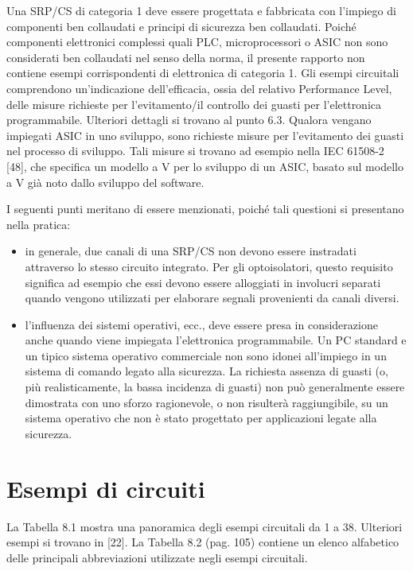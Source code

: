 Una SRP/CS di categoria 1 deve essere progettata e fabbricata con l'impiego di componenti ben collaudati e principi di sicurezza ben collaudati. Poiché componenti elettronici complessi quali PLC, microprocessori o ASIC non sono considerati ben collaudati nel senso della norma, il presente rapporto non contiene esempi corrispondenti di elettronica di categoria 1.
Gli esempi circuitali comprendono un'indicazione dell'efficacia, ossia del relativo Performance Level, delle misure richieste per l'evitamento/il controllo dei guasti per l'elettronica programmabile. Ulteriori dettagli si trovano al punto 6.3. Qualora vengano impiegati ASIC in uno sviluppo, sono richieste misure per l'evitamento dei guasti nel processo di sviluppo. Tali misure si trovano ad esempio nella IEC 61508-2 [48], che specifica un modello a V per lo sviluppo di un ASIC, basato sul modello a V già noto dallo sviluppo del software.

I seguenti punti meritano di essere menzionati, poiché tali questioni si presentano nella pratica:
\begin{itemize}
    \item in generale, due canali di una SRP/CS non devono essere instradati attraverso lo stesso circuito integrato. Per gli optoisolatori, questo requisito significa ad esempio che essi devono essere alloggiati in involucri separati quando vengono utilizzati per elaborare segnali provenienti da canali diversi.
    \item l'influenza dei sistemi operativi, ecc., deve essere presa in considerazione anche quando viene impiegata l'elettronica programmabile. Un PC standard e un tipico sistema operativo commerciale non sono idonei all'impiego in un sistema di comando legato alla sicurezza. La richiesta assenza di guasti (o, più realisticamente, la bassa incidenza di guasti) non può generalmente essere dimostrata con uno sforzo ragionevole, o non risulterà raggiungibile, su un sistema operativo che non è stato progettato per applicazioni legate alla sicurezza.
\end{itemize}

\section{Esempi di circuiti}
\label{sec:08-2}
La Tabella 8.1 mostra una panoramica degli esempi circuitali da 1 a 38. Ulteriori esempi si trovano in [22]. La Tabella 8.2 (pag. 105) contiene un elenco alfabetico delle principali abbreviazioni utilizzate negli esempi circuitali.

